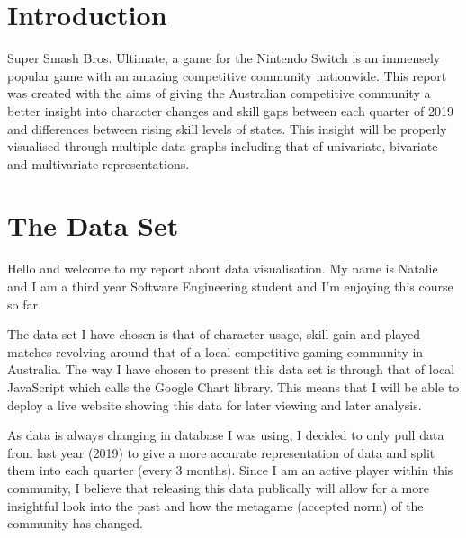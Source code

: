 \documentclass[11pt, oneside, a4paper]{article}
\begin{document}


\thispagestyle{empty}

\tableofcontents

\listoffigures

\newpage


\section{Introduction}
Super Smash Bros. Ultimate, a game for the Nintendo Switch is an immensely popular game with an amazing competitive community nationwide. This report was created with the aims of giving the Australian competitive community a better insight into character changes and skill gaps between each quarter of 2019 and differences between rising skill levels of states. This insight will be properly visualised through multiple data graphs including that of univariate, bivariate and multivariate representations.


\section{The Data Set}
Hello and welcome to my report about data visualisation. My name is Natalie and I am a third year Software Engineering student and I'm enjoying this course so far.
\

The data set I have chosen is that of character usage, skill gain and played matches revolving around that of a local competitive gaming community in Australia. The way I have chosen to present this data set is through that of local JavaScript which calls the Google Chart library. This means that I will be able to deploy a live website showing this data for later viewing and later analysis. 
\

As data is always changing in database I was using, I decided to only pull data from last year (2019) to give a more accurate representation of data and split them into each quarter (every 3 months). Since I am an active player within this community, I believe that releasing this data publically will allow for a more insightful look into the past and how the metagame (accepted norm) of the community has changed.
\
\end{document}
